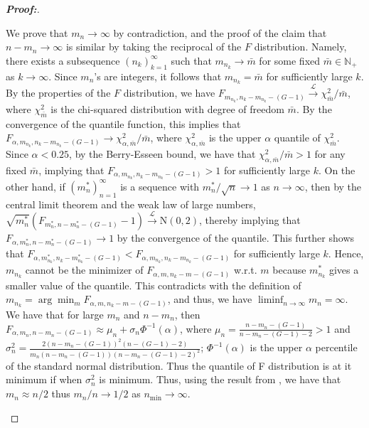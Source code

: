 \documentclass[times,sort&compress,3p]{elsarticle}
\theoremstyle{plain}%
\theoremstyle{definition}
\begin{document}
\begin{proof}[\textbf{\upshape Proof:}]
\begin{description}
{\color{black}
We prove that $m_n\to\infty$ by contradiction, and the proof of the claim that $n - m_n\to\infty$ is similar by taking the reciprocal of the $F$ distribution. Namely, there exists a subsequence $(n_k)_{k = 1}^\infty$ such that $m_{n_k}\to \bar{m}$ for some fixed $\bar{m}\in\mathbb{N}_+$ as $k\to\infty$. Since $m_n$'s are integers, it follows that $m_{n_k} = \bar{m}$ for sufficiently large $k$. By the properties of the $F$ distribution, we have $F_{m_{n_k}, n_k - m_{n_k} - (G - 1)} \overset{\mathcal{L}}{\to} \chi^2_{\bar{m}}/\bar{m}$, where $\chi^2_{\bar{m}}$ is the chi-squared distribution with degree of freedom $\bar{m}$. By the convergence of the quantile function, this implies that $F_{\alpha, m_{n_k}, n_k - m_{n_k} - (G - 1)}\to \chi_{\alpha,\bar{m}}^2/\bar{m}$, where $\chi_{\alpha,\bar{m}}^2$ is the upper $\alpha$ quantile of $\chi_{\bar{m}}^2$. Since $\alpha < 0.25$, by the Berry-Esseen bound, we have that $\chi_{\alpha,\bar{m}}^2/\bar{m} > 1$ for any fixed $\bar{m}$, implying that $F_{\alpha, m_{n_k}, n_k - m_{n_k} - (G - 1)} > 1$ for sufficiently large $k$. On the other hand, if $(m_n^*)_{n = 1}^\infty$ is a sequence with $m^*_n/\sqrt{n}\to 1$ as $n\to\infty$, then by the central limit theorem and the weak law of large numbers, $\sqrt{m_n^*}(F_{m_n^*,n - m_n^* - (G - 1)} - 1)\overset{\mathcal{L}}{\to}\mathrm{N}(0, 2)$, thereby implying that $F_{\alpha, m_n^*, n - m_n^* - (G - 1)}\to 1$ by the convergence of the quantile. This further shows that $F_{\alpha, m_{n_k}^*, n_k - m_{n_k}^* - (G - 1)} < F_{\alpha, m_{n_k}, n_k - m_{n_k} - (G - 1)}$ for sufficiently large $k$. Hence, $m_{n_k}$ cannot be the minimizer of $F_{\alpha, m, n_k - m - (G - 1)}$ w.r.t. $m$ because $m_{n_k}^*$ gives a smaller value of the quantile. This contradicts with the definition of $m_{n_k} = \arg\min_mF_{\alpha, m, n_k - m - (G - 1)}$, and thus, we have $\liminf_{n\to\infty}m_n = \infty$.
}
We have that for large $m_n$ and $n-m_n$, then $F_{\alpha, m_n, n-m_n-(G-1)} \approx \mu_n + \sigma_n\Phi^{-1}(\alpha)$, where $\mu_n = \frac{n-m_n-(G-1)}{n-m_n-(G-1) - 2} > 1$ and $\sigma^2_n = \frac{2(n-m_n-(G-1))^2 (n-(G-1)-2)}{m_n(n-m_n-(G-1))(n-m_n-(G-1)-2)^2}$; $\Phi^{-1}(\alpha)$ is the upper $\alpha$ percentile of the standard normal distribution. Thus the quantile of F distribution is at it minimum if when $\sigma^2_n$ is minimum. Thus, using the result from \cite{zoh2018powerful}, we have that $m_n \approx n/2$ thus $m_n/n \rightarrow 1/2$ as $n_{\min} \rightarrow \infty$. 


\end{description}
\end{proof}
\end{document}
